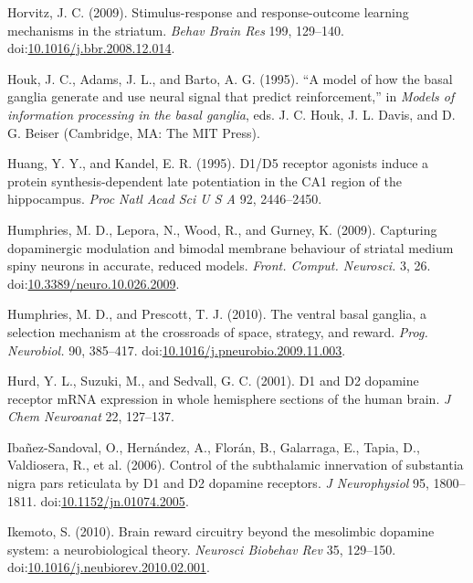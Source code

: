 \documentclass[
  11pt,
  a4paper,
]{scrbook}
\newlength{\cslhangindent}
\newenvironment{CSLReferences}[2] %
 {\begin{list}{}{%
  \setlength{\itemindent}{0pt}
  \setlength{\leftmargin}{0pt}
  \setlength{\parsep}{0pt}
  \ifodd #1
   \setlength{\leftmargin}{\cslhangindent}
   \setlength{\itemindent}{-1\cslhangindent}
  \fi
  \setlength{\itemsep}{#2\baselineskip}}}
 {\end{list}}
\begin{document}
\begin{CSLReferences}{1}{1}
Horvitz, J. C. (2009). Stimulus-response and response-outcome learning
mechanisms in the striatum. \emph{Behav Brain Res} 199, 129--140.
doi:\href{https://doi.org/10.1016/j.bbr.2008.12.014}{10.1016/j.bbr.2008.12.014}.

Houk, J. C., Adams, J. L., and Barto, A. G. (1995). {``A model of how
the basal ganglia generate and use neural signal that predict
reinforcement,''} in \emph{Models of information processing in the basal
ganglia}, eds. J. C. Houk, J. L. Davis, and D. G. Beiser (Cambridge, MA:
The MIT Press).

Huang, Y. Y., and Kandel, E. R. (1995). {D1/D5} receptor agonists induce
a protein synthesis-dependent late potentiation in the CA1 region of the
hippocampus. \emph{Proc Natl Acad Sci U S A} 92, 2446--2450.

Humphries, M. D., Lepora, N., Wood, R., and Gurney, K. (2009).
{Capturing dopaminergic modulation and bimodal membrane behaviour of
striatal medium spiny neurons in accurate, reduced models.} \emph{Front.
Comput. Neurosci.} 3, 26.
doi:\href{https://doi.org/10.3389/neuro.10.026.2009}{10.3389/neuro.10.026.2009}.

Humphries, M. D., and Prescott, T. J. (2010). {The ventral basal
ganglia, a selection mechanism at the crossroads of space, strategy, and
reward.} \emph{Prog. Neurobiol.} 90, 385--417.
doi:\href{https://doi.org/10.1016/j.pneurobio.2009.11.003}{10.1016/j.pneurobio.2009.11.003}.

Hurd, Y. L., Suzuki, M., and Sedvall, G. C. (2001). D1 and {D2} dopamine
receptor {mRNA} expression in whole hemisphere sections of the human
brain. \emph{J Chem Neuroanat} 22, 127--137.

Ibañez-Sandoval, O., Hernández, A., Florán, B., Galarraga, E., Tapia,
D., Valdiosera, R., et al. (2006). Control of the subthalamic
innervation of substantia nigra pars reticulata by {D1 and D2} dopamine
receptors. \emph{J Neurophysiol} 95, 1800--1811.
doi:\href{https://doi.org/10.1152/jn.01074.2005}{10.1152/jn.01074.2005}.

Ikemoto, S. (2010). {Brain reward circuitry beyond the mesolimbic
dopamine system: a neurobiological theory.} \emph{Neurosci Biobehav Rev}
35, 129--150.
doi:\href{https://doi.org/10.1016/j.neubiorev.2010.02.001}{10.1016/j.neubiorev.2010.02.001}.


\end{CSLReferences}
\end{document}
